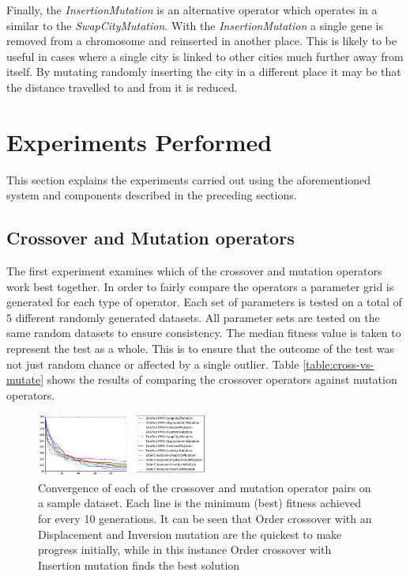 \documentclass[journal]{IEEEtran}
\begin{document}
Finally, the \textit{InsertionMutation} is an alternative operator which operates in a similar to the \textit{SwapCityMutation}. With the \textit{InsertionMutation} a single gene is removed from a chromosome and reinserted in another place. This is likely to be useful in cases where a single city is linked to other cities much further away from itself. By mutating randomly inserting the city in a different place it may be that the distance travelled to and from it is reduced.

\section{Experiments Performed}
\label{sec:experiments}
This section explains the experiments carried out using the aforementioned system and components described in the preceding sections.

\subsection{Crossover and Mutation operators}
The first experiment examines which of the crossover and mutation operators work best together. In order to fairly compare the operators a parameter grid is generated for each type of operator. Each set of parameters is tested on a total of $5$ different randomly generated datasets. All parameter sets are tested on the same random datasets to ensure consistency. The median fitness value is taken to represent the test as a whole. This is to ensure that the outcome of the test was not just random chance or affected by a single outlier. Table \ref{table:cross-vs-mutate} shows the results of comparing the crossover operators against mutation operators.

\begin{figure}[H]
\centering
\includegraphics[width=0.5\textwidth]{figures/cross_vs_mutate_convergence.png}
\caption{Convergence of each of the crossover and mutation operator pairs on a sample dataset. Each line is the minimum (best) fitness achieved for every 10 generations. It can be seen that Order crossover with an Displacement and Inversion mutation are the quickest to make progress initially, while in this instance Order crossover with Insertion mutation finds the best solution}
\label{fig:cross-vs-mutate}
\end{figure}
\end{document}
